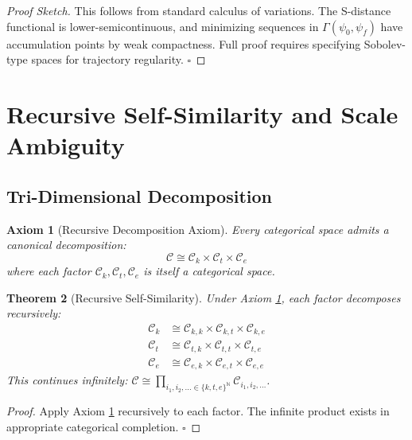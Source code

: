 \documentclass[12pt,a4paper]{article}
\newtheorem{theorem}{Theorem}[section]
\newtheorem{axiom}[theorem]{Axiom}
\begin{document}
\begin{proof}[Proof Sketch]
This follows from standard calculus of variations. The S-distance functional is lower-semicontinuous, and minimizing sequences in $\Gamma(\psi_0, \psi_f)$ have accumulation points by weak compactness. Full proof requires specifying Sobolev-type spaces for trajectory regularity. $\square$
\end{proof}

\section{Recursive Self-Similarity and Scale Ambiguity}

\subsection{Tri-Dimensional Decomposition}

\begin{axiom}[Recursive Decomposition Axiom]
\label{axiom:recursive_decomposition}
Every categorical space admits a canonical decomposition:
\begin{equation}
\mathcal{C} \cong \mathcal{C}_k \times \mathcal{C}_t \times \mathcal{C}_e
\end{equation}
where each factor $\mathcal{C}_k, \mathcal{C}_t, \mathcal{C}_e$ is itself a categorical space.
\end{axiom}

\begin{theorem}[Recursive Self-Similarity]
\label{thm:recursive_self_similarity}
Under Axiom \ref{axiom:recursive_decomposition}, each factor decomposes recursively:
\begin{align}
\mathcal{C}_k &\cong \mathcal{C}_{k,k} \times \mathcal{C}_{k,t} \times \mathcal{C}_{k,e} \\
\mathcal{C}_t &\cong \mathcal{C}_{t,k} \times \mathcal{C}_{t,t} \times \mathcal{C}_{t,e} \\
\mathcal{C}_e &\cong \mathcal{C}_{e,k} \times \mathcal{C}_{e,t} \times \mathcal{C}_{e,e}
\end{align}
This continues infinitely: $\mathcal{C} \cong \prod_{i_1, i_2, \ldots \in \{k,t,e\}^{\mathbb{N}}} \mathcal{C}_{i_1, i_2, \ldots}$.
\end{theorem}

\begin{proof}
Apply Axiom \ref{axiom:recursive_decomposition} recursively to each factor. The infinite product exists in appropriate categorical completion. $\square$
\end{proof}
\end{document}
